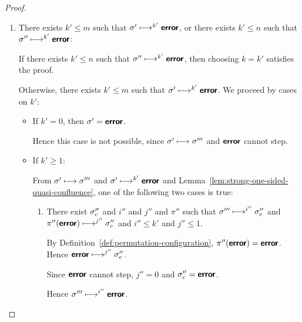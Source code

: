 \begin{proof}
\begin{enumerate}
\begin{itemize}
\begin{enumerate}
          Therefore, $\conf'' \ctxstepsto^{j'} \piprimeinv(\conf_c')
          \ctxstepsto^{k''} \error$.

          Hence $\conf'' \ctxstepsto^{j' + k''} \error$.

          Since $j' \leq n$ and $k'' \leq 1$, $j' + k'' \leq n + 1$.

          Hence choosing $k = j' + k''$ satisfies the proof.

      \end{enumerate}
    \end{itemize}

  \item There exists $k' \leq m$ such that $\sigma' \longmapsto^{k'}
    \textbf{\textsf{error}}$, or there exists $k' \leq n$ such that $\sigma''
    \longmapsto^{k'} \textbf{\textsf{error}}$:

    If there exists $k' \leq n$ such that $\sigma'' \longmapsto^{k'}
    \textbf{\textsf{error}}$, then choosing $k = k'$ satisfies the proof.

    Otherwise, there exists $k' \leq m$ such that $\sigma'
    \longmapsto^{k'} \textbf{\textsf{error}}$.  We proceed by cases on $k'$:

    \begin{itemize}

    \item If $k' = 0$, then $\sigma' = \textbf{\textsf{error}}$.

      Hence this case is not possible, since $\sigma' \longmapsto
      \sigma'''$ and $\textbf{\textsf{error}}$ cannot step.

    \item If $k' \geq 1$:

      From $\sigma' \longmapsto \sigma'''$ and $\sigma' \longmapsto^{k'}
      \textbf{\textsf{error}}$ and Lemma~\ref{lem:strong-one-sided-quasi-confluence},
      one of the following two cases is true:

      \begin{enumerate}
        \item There exist $\sigma''_c$ and $i''$ and $j''$ and $\pi''$
          such that $\sigma''' \longmapsto^{i''} \sigma''_c$ and
          $\pi''(\textbf{\textsf{error}}) \longmapsto^{j''} \sigma''_c$ and $i'' \leq
          k'$ and $j'' \leq 1$.

          By Definition~\ref{def:permutation-configuration},
          $\pi''(\textbf{\textsf{error}}) = \textbf{\textsf{error}}$.  Hence $\textbf{\textsf{error}} \longmapsto^{j''}
          \sigma''_c$.

          Since $\textbf{\textsf{error}}$ cannot step, $j'' = 0$ and $\sigma''_c =
          \textbf{\textsf{error}}$.

          Hence $\sigma''' \longmapsto^{i''} \textbf{\textsf{error}}$.


\end{enumerate}
\end{itemize}
\end{enumerate}
\end{proof}
